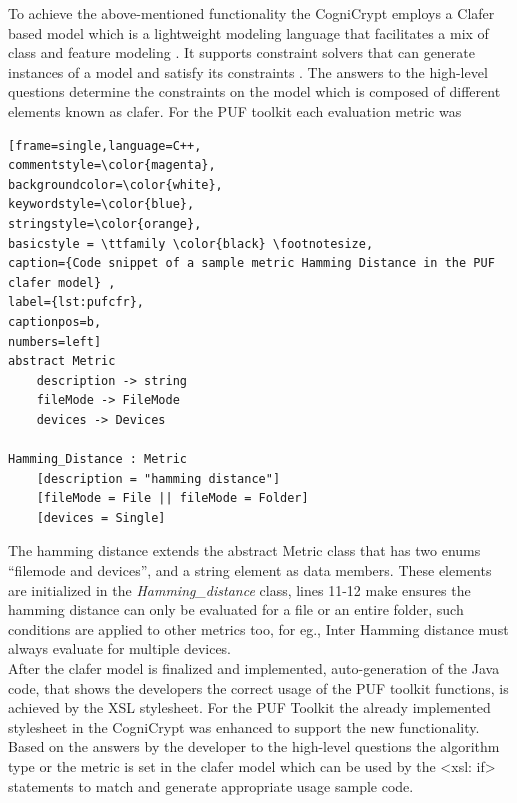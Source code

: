 To achieve the above-mentioned functionality the CogniCrypt employs a Clafer based model which is a lightweight modeling language that facilitates a mix of class and feature modeling \cite{clafer,cogni}. It supports constraint solvers that can generate instances of a model and satisfy its constraints \cite{cogni}. The answers to the high-level questions determine the constraints on the model which is composed of different elements known as clafer. For the PUF toolkit each evaluation metric was

\begin{lstlisting}[frame=single,language=C++,
commentstyle=\color{magenta},
backgroundcolor=\color{white},
keywordstyle=\color{blue},
stringstyle=\color{orange},
basicstyle = \ttfamily \color{black} \footnotesize,
caption={Code snippet of a sample metric Hamming Distance in the PUF clafer model} ,
label={lst:pufcfr},
captionpos=b,
numbers=left]
abstract Metric
	description -> string
	fileMode -> FileMode
	devices -> Devices

Hamming_Distance : Metric
	[description = "hamming distance"]
	[fileMode = File || fileMode = Folder]
	[devices = Single]
\end{lstlisting}

The hamming distance extends the abstract Metric class that has two enums ``filemode and devices'', and a string element as data members. These elements are initialized in the \emph{Hamming\_distance} class, lines 11-12 make ensures the hamming distance can only be evaluated for a file or an entire folder, such conditions are applied to other metrics too, for eg., Inter Hamming distance must always evaluate for multiple devices.\\ 

After the clafer model is finalized and implemented, auto-generation of the Java code, that shows the developers the correct usage of the PUF toolkit functions, is achieved by the XSL stylesheet. For the PUF Toolkit the already implemented stylesheet in the CogniCrypt was enhanced to support the new functionality. Based on the answers by the developer to the high-level questions the algorithm type or the metric is set in the clafer model which can be used by the <xsl: if> statements
to match and generate appropriate usage sample code. %


